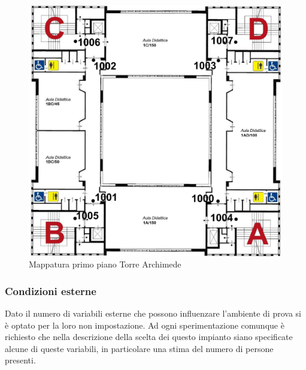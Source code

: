 \documentclass[../SperimentazioniPratiche.tex]{subfiles}
\begin{document}
			\begin{figure}[p]
				\includegraphics[width=\textwidth]{img/PrimoPiano}
				\caption{Mappatura primo piano Torre Archimede}
				\label{fig:PrimoPiano}
			\end{figure}
			
	
		\newpage
		\subsubsection{Condizioni esterne}
			Dato il numero di variabili esterne che possono influenzare l'ambiente di prova si è optato per la loro non impostazione. Ad ogni sperimentazione comunque è richiesto che nella descrizione della scelta dei questo impianto siano specificate alcune di queste variabili, in particolare una stima del numero di persone presenti.
\end{document}
